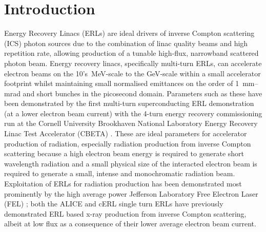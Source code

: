 \documentclass[../main.tex]{subfiles}
\begin{document}
\chapter{Introduction}
\label{Introduction} %

Energy Recovery Linacs (ERLs) are ideal drivers of inverse Compton scattering (ICS) photon sources due to the combination of linac quality beams and high repetition rate, allowing production of a tunable high-flux, narrowband scattered photon beam. Energy recovery linacs, specifically multi-turn ERLs, can accelerate electron beams on the 10's~\si{\mega\electronvolt}-scale to the \si{\giga\electronvolt}-scale within a small accelerator footprint whilst maintaining small normalised emittances on the order of 1~\si{\milli\meter}--\si{\milli\radian} and short bunches in the picosecond domain. Parameters such as these have been demonstrated by the first multi-turn superconducting ERL demonstration (at a lower electron beam current) with the 4-turn energy recovery commissioning run at the Cornell University Brookhaven National Laboratory Energy Recovery Linac Test Accelerator (CBETA) \cite{hoffstaetter2017cbeta,bartnik2020cbeta}. These are ideal parameters for accelerator production of radiation, especially radiation production from inverse Compton scattering because a high electron beam energy is required to generate short wavelength radiation and a small physical size of the interacted electron beam is required to generate a small, intense and monochromatic radiation beam. Exploitation of ERLs for radiation production has been demonstrated most prominently by the high average power Jefferson Laboratory Free Electron Laser (FEL) \cite{neil2006jlab}; both the ALICE \cite{priebe2010first} and cERL \cite{akagi2016narrow} single turn ERLs have previously demonstrated ERL based x-ray production from inverse Compton scattering, albeit at low flux as a consequence of their lower average electron beam current. 
\end{document}
